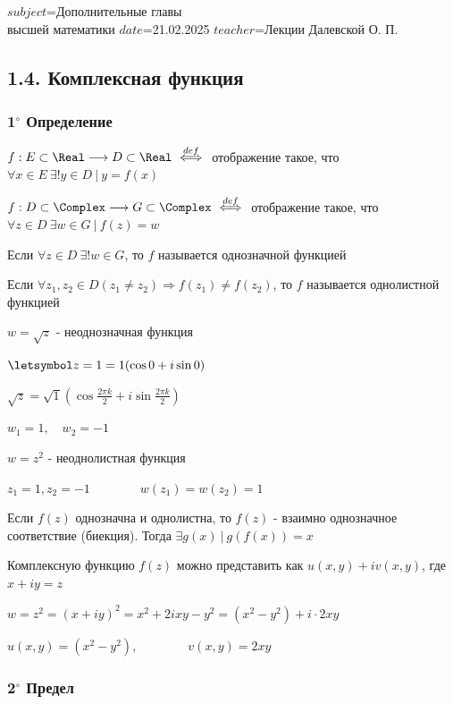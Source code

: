 $subject$=Дополнительные главы \\ высшей математики
$date$=21.02.2025
$teacher$=Лекции Далевской О. П.

\subsection{1.4. Комплексная функция}

\subsubsection{1$^\circ$ Определение}

\Mem $f : E \subset \Real \longrightarrow D \subset \Real \ \overset{def}{\Longleftrightarrow} \ $ отображение такое, 
что $\forall x \in E \ \exists! y \in D \ | \ y = f(x)$

\Def $f : D \subset \Complex \longrightarrow G \subset \Complex \ \overset{def}{\Longleftrightarrow} \ $ отображение такое, 
что $\forall z \in D \ \exists w \in G \ | \ f(z) = w$

\Defs Если $\forall z \in D \ \exists! w \in G$, то $f$ называется однозначной функцией

\Defs Если $\forall z_1, z_2 \in D (z_1 \neq z_2) \Longrightarrow f(z_1) \neq f(z_2)$, 
то $f$ называется однолистной функцией

 $w = \sqrt{z}$ - неоднозначная функция

$\letsymbol z = 1 = 1 (\cos 0 + i \sin 0)$

$\sqrt{z} = \sqrt{1} \left(\cos \frac{2\pi k}{2} + i \sin \frac{2\pi k}{2}\right)$

$w_1 = 1, \quad w_2 = -1$

 $w = z^2$ - неоднолистная функция

$z_1 = 1, z_2 = -1 \qquad\qquad w(z_1) = w(z_2) = 1$

\Nota Если $f(z)$ однозначна и однолистна, то $f(z)$ - взаимно однозначное соответствие (биекция). Тогда $\exists g(x) \ | \ g(f(x)) = x$

Комплексную функцию $f(z)$ можно представить как $u(x, y) + i v(x, y)$, где $x + iy = z$

\Ex $w = z^2 = (x + iy)^2 = x^2 + 2ixy - y^2 = (x^2 - y^2) + i \cdot 2xy$

$u(x, y) = (x^2 - y^2), \qquad\qquad v(x, y) = 2xy$

\subsubsection{2$^\circ$ Предел}

